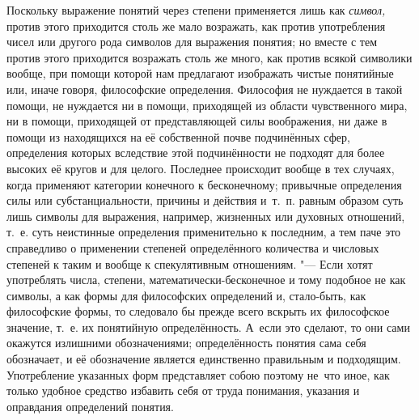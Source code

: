 Поскольку выражение понятий через степени применяется лишь как {\em символ,}
против этого приходится столь же мало возражать, как против употребления чисел
или другого рода символов для выражения понятия; но вместе с тем против этого
приходится возражать столь же много, как против всякой символики вообще, при
помощи которой нам предлагают изображать чистые понятийные или, иначе говоря,
философские определения. Философия не нуждается в такой помощи, не нуждается ни
в помощи, приходящей из области чувственного мира, ни в помощи, приходящей от
представляющей силы воображения, ни даже в помощи из находящихся на её
собственной почве подчинённых сфер, определения которых вследствие этой
подчинённости не подходят для более высоких её кругов и для целого. Последнее
происходит вообще в тех случаях, когда применяют категории конечного к
бесконечному; привычные определения силы или субстанциальности, причины и
действия и~т.~п. равным образом суть лишь символы для выражения, например,
жизненных или духовных отношений, т.~е. суть неистинные определения
применительно к последним, а тем паче это справедливо о применении степеней
определённого количества и числовых степеней к таким и вообще к спекулятивным
отношениям. "--- Если хотят употреблять числа, степени,
математически-бесконечное и тому подобное не как символы, а как формы для
философских определений и, стало-быть, как философские формы, то следовало бы
прежде всего вскрыть их философское значение, т.~е. их понятийную
определённость. А~если это сделают, то они сами окажутся излишними
обозначениями; определённость понятия сама себя обозначает, и её обозначение
является единственно правильным и подходящим. Употребление указанных форм
представляет собою поэтому не~что иное, как только удобное средство избавить
себя от труда понимания, указания и оправдания определений понятия.

\bigskip
